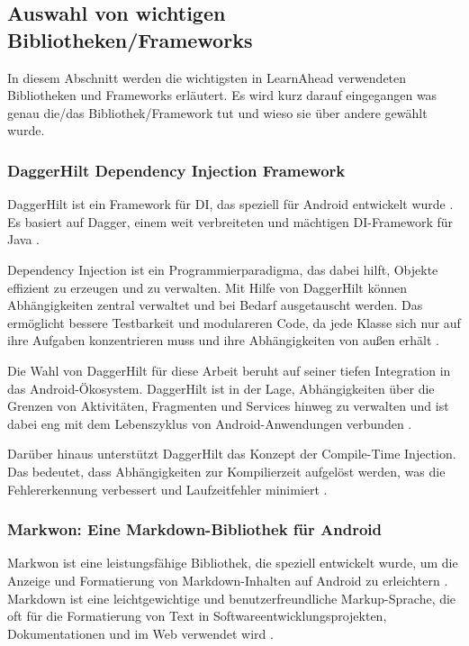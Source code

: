 \subsection{Auswahl von wichtigen Bibliotheken/Frameworks} \label{Auswahl BibliothekenFrameworks}
In diesem Abschnitt werden die wichtigsten in LearnAhead verwendeten Bibliotheken und Frameworks erläutert. Es wird kurz darauf eingegangen was genau die/das Bibliothek/Framework tut und wieso sie über andere gewählt wurde.

\subsubsection{DaggerHilt Dependency Injection Framework}
DaggerHilt ist ein Framework für \ac{DI}, das speziell für Android entwickelt wurde \cite{Dagger2021}. Es basiert auf Dagger, einem weit verbreiteten und mächtigen DI-Framework für Java \cite{AndroidDevelopers2021}. \newline

\noindent
Dependency Injection ist ein Programmierparadigma, das dabei hilft, Objekte effizient zu erzeugen und zu verwalten. Mit Hilfe von DaggerHilt können Abhängigkeiten zentral verwaltet und bei Bedarf ausgetauscht werden. Das ermöglicht bessere Testbarkeit und modulareren Code, da jede Klasse sich nur auf ihre Aufgaben konzentrieren muss und ihre Abhängigkeiten von außen erhält \cite{Dagger2021}. \newline

\noindent
Die Wahl von DaggerHilt für diese Arbeit beruht auf seiner tiefen Integration in das Android-Ökosystem. DaggerHilt ist in der Lage, Abhängigkeiten über die Grenzen von Aktivitäten, Fragmenten und Services hinweg zu verwalten und ist dabei eng mit dem Lebenszyklus von Android-Anwendungen verbunden \cite{AndroidDevelopers2021}. \newline

\noindent
Darüber hinaus unterstützt DaggerHilt das Konzept der Compile-Time Injection. Das bedeutet, dass Abhängigkeiten zur Kompilierzeit aufgelöst werden, was die Fehlererkennung verbessert und Laufzeitfehler minimiert \cite{Dagger2021}.

\subsubsection{Markwon: Eine Markdown-Bibliothek für Android}
Markwon ist eine leistungsfähige Bibliothek, die speziell entwickelt wurde, um die Anzeige und Formatierung von Markdown-Inhalten auf Android zu erleichtern \cite{Markwon2022}. Markdown ist eine leichtgewichtige und benutzerfreundliche Markup-Sprache, die oft für die Formatierung von Text in Softwareentwicklungsprojekten, Dokumentationen und im Web verwendet wird \cite{Gruber2004}. \newline

